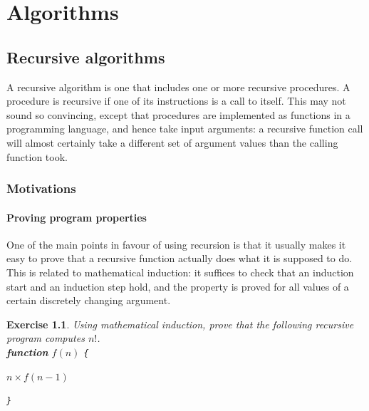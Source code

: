 \documentclass[a4paper]{book}
\theoremstyle{changebreak}                %
\newtheorem{ex}[result]{Exercise}
\begin{document}
\part{Algorithms}
\label{p:alg}

\chapter{Recursive algorithms}
\label{c:recursion}

\begin{center}
\end{center}

A recursive algorithm is one that includes one or more recursive
procedures. A procedure is recursive if one
of its instructions is a call to itself. This may not sound so
convincing, except that procedures are implemented as functions in a
programming language, and hence take input arguments: a recursive
function call will almost certainly
take a different set of argument values than the calling function
took. 

\section{Motivations}

\subsection{Proving program properties}
One of the main points in favour of using recursion is that it usually
makes it easy to prove that a recursive function actually does what it
is supposed to do. This is related to mathematical
induction: it suffices to check that an
induction start and an induction step hold, and the property is proved
for all values of a certain discretely changing argument.

\begin{ex}
\label{ex:factorialrecursive}
Using mathematical induction, prove that the following
recursive program computes $n!$. \\ 
{\bf function} $f(n)$ {\tt \{} \\ [-1em]
\begin{algorithmic}
\ENDIF
\RETURN $n\times f(n-1)$
\end{algorithmic} 
\vspace*{-1em}
{\tt \}}
\end{ex}
\end{document}
